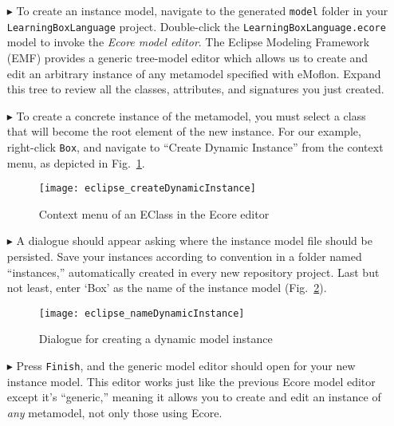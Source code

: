 \begin{itemize}

\item[$\blacktriangleright$] To create an instance model, navigate to the generated \texttt{model} folder in your \texttt{LearningBoxLanguage} project.
Double-click the \texttt{LearningBoxLa\-nguage.ecore} model to invoke  the \emph{Ecore model editor}. The Eclipse Modeling Framework (EMF) provides a generic
tree-model editor which allows us to create and edit an arbitrary instance of any metamodel specified with eMoflon. Expand this tree to review all the classes,
attributes, and signatures you just created.

\vspace{0.5cm}

\item[$\blacktriangleright$] To create a concrete instance of the metamodel, you must select a class that will become the root element of the new instance.
For our example, right-click \texttt{Box}, and navigate to ``Create Dynamic Instance'' from the context menu, as depicted in Fig.~\ref{fig:context_menu}.

\begin{figure}[htbp]
	\centering
  \texttt{[image: eclipse\_createDynamicInstance]}
	\caption{Context menu of an EClass in the Ecore editor}
	\label{fig:context_menu}
\end{figure}

\vspace{0.5cm}

\item[$\blacktriangleright$] A dialogue should appear asking where the instance model file should be persisted. Save your instances according to convention in a
folder named ``instances,'' automatically created in every new repository project. Last but not least, enter `Box' as the name of the instance model
(Fig.~\ref{fig:store_dynamic_instance}).

\vspace{0.5cm}

\begin{figure}[htbp]
	\centering
  \texttt{[image: eclipse\_nameDynamicInstance]}
	\caption{Dialogue for creating a dynamic model instance}
	\label{fig:store_dynamic_instance}
\end{figure}

\item[$\blacktriangleright$] Press \texttt{Finish}, and the generic model editor should open for your new instance model. This editor works just like the
previous Ecore model editor except it's ``generic,'' meaning it allows you to create and edit an instance of \emph{any} metamodel, not only those using Ecore.


\end{itemize}
